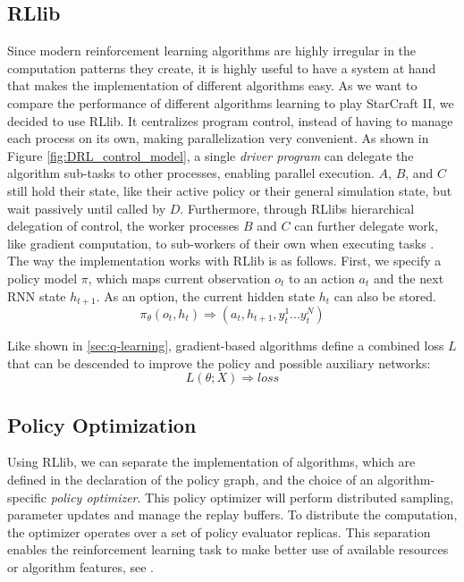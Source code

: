 \documentclass[12pt,a4paper]{article}
\begin{document}
\subsection{RLlib}
Since modern reinforcement learning algorithms are highly irregular in the computation patterns they create, it is highly useful to have a system at hand that makes the implementation of different algorithms easy. As we want to compare the performance of different algorithms learning to play StarCraft II, we decided to use RLlib. It centralizes program control, instead of having to manage each process on its own, making parallelization very convenient. As shown in Figure \ref{fig:DRL_control_model}, a single {\it driver program} can delegate the algorithm sub-tasks to other processes, enabling parallel execution. $A$, $B$, and $C$ still hold their state, like their active policy or their general simulation state, but wait passively until called by $D$.  Furthermore, through RLlibs hierarchical delegation of control, the worker processes $B$ and $C$ can further delegate work, like gradient computation, to sub-workers of their own when executing tasks \cite{Liang2017}.
The way the implementation works with RLlib is as follows. First, we specify a policy model $\pi$, which maps current observation $o_t$  to an action $a_t$ and the next RNN state $h_{t+1}$. As an option, the current hidden state $h_t$ can also be stored.
\begin{equation}
    \label{eq:policy_graph}
    \pi_\theta(o_t, h_t) \Rightarrow (a_t,h_{t+1}, y_t^1 ... y_t^N)
\end{equation}

Like shown in \ref{sec:q-learning}, gradient-based algorithms define a combined loss $L$ that can be descended to improve the policy and possible auxiliary networks:
\begin{equation}
    \label{eq:combined_loss}
    L(\theta; X) \Rightarrow loss
\end{equation}

\subsection{Policy Optimization}
Using RLlib, we can separate the implementation of algorithms, which are defined in the declaration of the policy graph, and the choice of an algorithm-specific {\it policy optimizer}. This policy optimizer will perform distributed sampling, parameter updates and manage the replay buffers. To distribute the computation, the optimizer operates over a set of policy evaluator replicas. This separation enables the reinforcement learning task to make better use of available resources or algorithm features, see \cite{Liang2017}.
\end{document}
